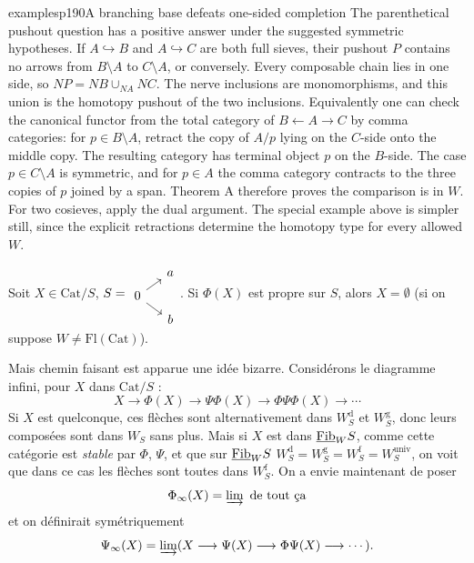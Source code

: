 \begin{dcomment}{examples}{p190}{A branching base defeats one-sided completion}
The parenthetical pushout question has a positive answer under the suggested symmetric hypotheses. If $A\hookrightarrow B$ and $A\hookrightarrow C$ are both full sieves, their pushout $P$ contains no arrows from $B\setminus A$ to $C\setminus A$, or conversely. Every composable chain lies in one side, so $NP=NB\cup_{NA}NC$. The nerve inclusions are monomorphisms, and this union is the homotopy pushout of the two inclusions. Equivalently one can check the canonical functor from the total category of $B\leftarrow A\to C$ by comma categories: for $p\in B\setminus A$, retract the copy of $A/p$ lying on the $C$-side onto the middle copy. The resulting category has terminal object $p$ on the $B$-side. The case $p\in C\setminus A$ is symmetric, and for $p\in A$ the comma category contracts to the three copies of $p$ joined by a span. Theorem A therefore proves the comparison is in $W$. For two cosieves, apply the dual argument. The special example above is simpler still, since the explicit retractions determine the homotopy type for every allowed $W$.
\end{dcomment}



\noindent\llap{$|||$\quad}Soit $X \in \mathrm{Cat}/S$, $S = \begin{tikzcd}[row sep=tiny, column sep=small] & a \\ 0 \arrow[ur] \arrow[dr] & \\ & b \end{tikzcd}$. Si $\Phi(X)$ est propre sur $S$, alors $X = \emptyset$ (si on suppose $W \neq \mathrm{Fl}(\mathrm{Cat})$).

Mais chemin faisant est apparue une idée bizarre. Considérons le diagramme infini, pour $X$ dans $\mathrm{Cat}/S$ :
\[
X \longrightarrow \Phi(X) \longrightarrow \Psi\Phi(X) \longrightarrow \Phi\Psi\Phi(X) \longrightarrow \cdots
\]
Si $X$ est quelconque, ces flèches sont alternativement dans $W_S^{\mathrm{d}}$ et $W_S^{\mathrm{g}}$, donc leurs composées sont dans $W_S$ sans plus. Mais si $X$ est dans $\underline{\mathrm{Fib}}_W S$, comme cette catégorie est \textit{stable} par $\Phi$, $\Psi$, et que sur $\underline{\mathrm{Fib}}_W S$ $W_S^{\mathrm{d}} = W_S^{\mathrm{g}} = W_S^{\mathrm{f}} = W_S^{\mathrm{univ}}$, on voit que dans ce cas les flèches sont toutes dans $W_S^{\mathrm{f}}$. On a envie maintenant de poser
\[
\Phi_\infty(X) = \varinjlim \text{ de tout ça}
\]
et on définirait symétriquement
\[
\Psi_\infty(X) = \varinjlim (X \longrightarrow \Psi(X) \longrightarrow \Phi\Psi(X) \longrightarrow \cdots).
\]

